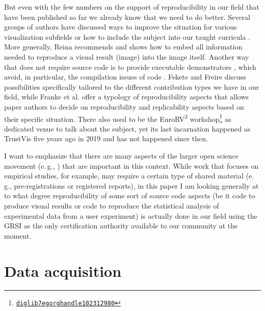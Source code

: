 \documentclass[conference]{vgtc}                     %
\newcommand{\eg}{e.\,g.}
\begin{document}
But even with the few numbers on the support of reproducibility in our field that have been published so far we already know that we need to do better. Several groups of authors have discussed ways to improve the situation for various visualization subfields \cite{Chopra:2023:PGG,Cushing:2018:SVR,Sukumar:2018:TDU,Valdez:2018:RRR} or how to include the subject into our taught curricula \cite{Syeda:2024:VRT}. More generally, Reina \cite{Reina:2023:CID} recommends and shows how to embed all information needed to reproduce a visual result (image) into the image itself. Another way that does not require source code is to provide executable demonstrators \cite{Bonneel:2020:CRC,Isenberg:2022:PEP}, which avoid, in particular, the compilation issues of code \cite{Bonneel:2020:CRC}. Fekete and Freire \cite{Fekete:2020:ERV} discuss possibilities specifically tailored to the different contribution types we have in our field, while Franke et al. \cite{Franke:2023:TRV} offer a typology of reproducibility aspects that allows paper authors to decide on reproducibility and replicability aspects based on their specific situation. There also used to be the EuroRV\textsuperscript{3} workshop\footnote{\href{https://diglib7.eg.org/handle/10.2312/980}{\texttt{diglib7egorg\discretionary{/}{}{/}handle\discretionary{/}{}{/}102312\discretionary{/}{}{/}980}}} as dedicated venue to talk about the subject, yet its last incarnation happened as TrustVis five years ago in 2019 and has not happened since then.

I want to emphasize that there are many aspects of the larger open science movement (\eg, \cite{Jansen:2024:MWB}) that are important in this context. While work that focuses on empirical studies, for example, may require a certain type of shared material \cite{Kosara:2018:SRC} (\eg, pre-registrations or registered reports), in this paper I am looking generally at to what degree reproducibility of some sort of source code aspects (be it code to produce visual results or code to reproduce the statistical analysis of experimental data from a user experiment) is actually done in our field using the GRSI as the only certification authority available to our community at the moment.

\section{Data acquisition}
\label{sec:data}
\end{document}
